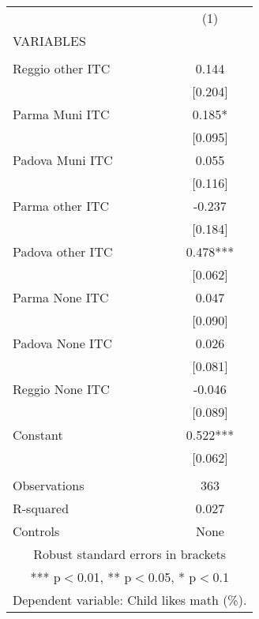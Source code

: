 \begin{tabular}{lc} \hline
 & (1) \\
VARIABLES &  \\ \hline
 &  \\
Reggio other ITC & 0.144 \\
 & [0.204] \\
Parma Muni ITC & 0.185* \\
 & [0.095] \\
Padova Muni ITC & 0.055 \\
 & [0.116] \\
Parma other ITC & -0.237 \\
 & [0.184] \\
Padova other ITC & 0.478*** \\
 & [0.062] \\
Parma None ITC & 0.047 \\
 & [0.090] \\
Padova None ITC & 0.026 \\
 & [0.081] \\
Reggio None ITC & -0.046 \\
 & [0.089] \\
Constant & 0.522*** \\
 & [0.062] \\
 &  \\
Observations & 363 \\
R-squared & 0.027 \\
 Controls & None \\ \hline
\multicolumn{2}{c}{ Robust standard errors in brackets} \\
\multicolumn{2}{c}{ *** p$<$0.01, ** p$<$0.05, * p$<$0.1} \\
\multicolumn{2}{c}{ Dependent variable: Child likes math (\%).} \\
\end{tabular}
